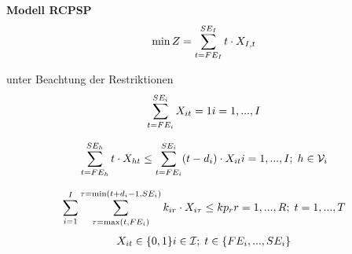 \documentclass[a4paper,12pt,parskip,bibtotoc,liststotoc]{article}
\begin{document}
\textbf{Modell RCPSP}
\begin{eqnarray} \label{Ziel}
\min Z = \sum_{t=FE_{I}}^{SE_{I}}t \cdot X_{I,t}\hfill  
\end{eqnarray}

unter Beachtung der Restriktionen
\begin{multline} \label{N1}
\sum_{t=FE_{i}}^{SE_{i}} X_{it} = 1
\hfill   i = 1,...,I
\end{multline}\vspace{-3.0ex}

\begin{multline} \label{N2}
\sum_{t=FE_{h}}^{SE_{h}}t \cdot X_{ht} \leq \sum_{t=FE_{i}}^{SE_{i}}(t - d_{i}) \cdot X_{it}
\hfill   i =1,...,I;\; h \in \mathcal{V}_{i}
\end{multline}\vspace{-3.0ex}

\begin{multline} \label{N3}
\sum_{i=1}^{I}\sum_{\tau=\max(t,FE_{i})}^{\tau=\min(t+d_i-1,SE_i)}k_ {ir} \cdot X_{i\tau} \leq kp_{r}
\hfill   r =1,...,R;\; t=1,...,T
\end{multline}\vspace{-3.0ex}
\begin{multline} \label{N4}
X_{it} \in \{0,1\}
\hfill   i \in \mathcal{I};\; t \in \{FE_{i},...,SE_{i}\}\end{multline}\vspace{-6.0ex}\\
\end{document}
